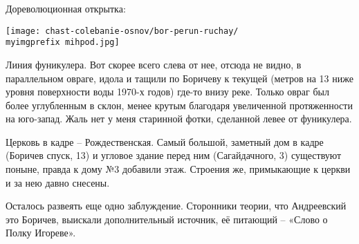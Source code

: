 


Дореволюционная открытка: 

\begin{center}
\texttt{[image: chast-colebanie-osnov/bor-perun-ruchay/\\myimgprefix mihpod.jpg]}
\end{center}

Линия фуникулера. Вот скорее всего слева от нее, отсюда не видно, в параллельном овраге, идола и тащили по Боричеву к текущей (метров на 13 ниже уровня поверхности воды 1970-х годов) где-то внизу реке. Только овраг был более углубленным в склон, менее крутым благодаря увеличенной протяженности на юго-запад. Жаль нет у меня старинной фотки, сделанной левее от фуникулера.

Церковь в кадре – Рождественская. Самый большой, заметный дом в кадре (Боричев спуск, 13) и угловое здание перед ним (Сагайдачного, 3) существуют поныне, правда к дому №3 добавили этаж. Строения же, примыкающие к церкви и за нею давно снесены.



Осталось развеять еще одно заблуждение. Сторонники теории, что Андреевский это Боричев, выискали дополнительный источник, её питающий – «Слово о Полку Игореве».
